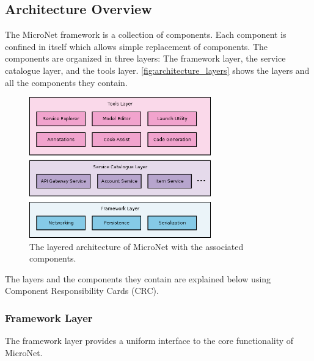 \subsection{Architecture Overview}

The MicroNet framework is a collection of components. Each component is
confined in itself which allows simple replacement of components. The components
are organized in three layers: The framework layer, the service catalogue layer,
and the tools layer. \autoref{fig:architecture_layers} shows the layers and all
the components they contain.

\begin{figure}
  \centering
  \includegraphics[width=0.7\textwidth]{images/architecture/ArchitectureLayers}
  \caption{The layered architecture of MicroNet with the associated components.}
  \label{fig:architecture_layers}
\end{figure}


The layers and the components they contain are explained below using Component
Responsibility Cards (CRC).

\newpage
\subsubsection{Framework Layer}

The framework layer provides a uniform interface to the core functionality of
MicroNet.\\

